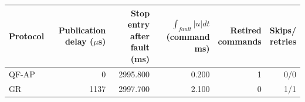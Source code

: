 \begin{tabular}{@{}lrrrrr@{}}
\toprule
Protocol & \shortstack{Publication\\delay ($\mu$s)} & \shortstack{Stop entry\\after fault (ms)} & \shortstack{$\int_{fault}|u|dt$\\(command ms)} & \shortstack{Retired\\commands} & \shortstack{Skips/\\retries} \\
\midrule
QF-AP & 0 & 2995.800 & 0.200 & 1 & 0/0 \\
GR & 1137 & 2997.700 & 2.100 & 0 & 1/1 \\
\bottomrule
\end{tabular}
